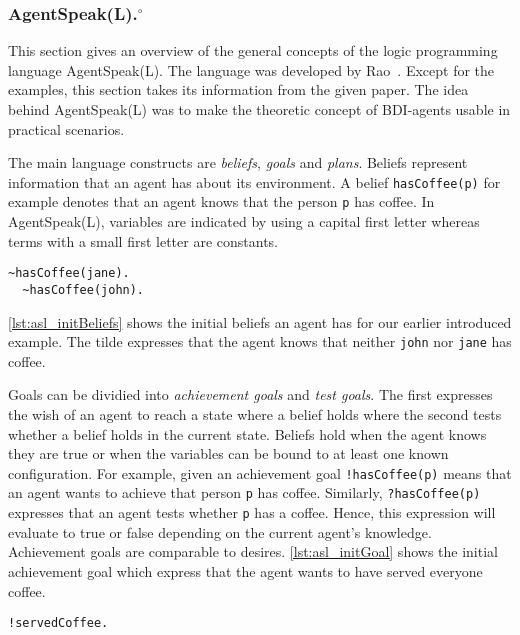 \subsubsection[AgentSpeak(L).]{AgentSpeak(L).$^\circ$}
This section gives an overview of the general concepts of the logic programming language AgentSpeak(L). The language was developed by Rao~\cite{rao_agentspeak_1996}. Except for the examples, this section takes its information from the given paper. The idea behind AgentSpeak(L) was to make the theoretic concept of BDI-agents usable in practical scenarios. %

The main language constructs are \emph{beliefs}, \emph{goals} and \emph{plans}. Beliefs represent information that an agent has about its environment. A belief \texttt{hasCoffee(p)} for example denotes that an agent knows that the person \texttt{p} has coffee. In AgentSpeak(L), variables are indicated by using a capital first letter whereas terms with a small first letter are constants. %
\begin{lstlisting}[caption={Initial beliefs.}, label=lst:asl_initBeliefs]
  ~hasCoffee(jane).
  ~hasCoffee(john).
\end{lstlisting}
\autoref{lst:asl_initBeliefs} shows the initial beliefs an agent has for our earlier introduced example. The tilde expresses that the agent knows that neither \texttt{john} nor \texttt{jane} has coffee. %

Goals can be dividied into \emph{achievement goals} and \emph{test goals}. The first expresses the wish of an agent to reach a state where a belief holds where the second tests whether a belief holds in the current state. Beliefs hold when the agent knows they are true or when the variables can be bound to at least one known configuration. For example, given an achievement goal \texttt{!hasCoffee(p)} means that an agent wants to achieve that person \texttt{p} has coffee. Similarly, \texttt{?hasCoffee(p)} expresses that an agent tests whether \texttt{p} has a coffee. Hence, this expression will evaluate to true or false depending on the current agent's knowledge.
Achievement goals are comparable to desires. %
\autoref{lst:asl_initGoal} shows the initial achievement goal which express that the agent wants to have served everyone coffee.
\begin{lstlisting}[firstnumber=3, caption={Initial goal.}, label=lst:asl_initGoal]
  !servedCoffee.
\end{lstlisting}

